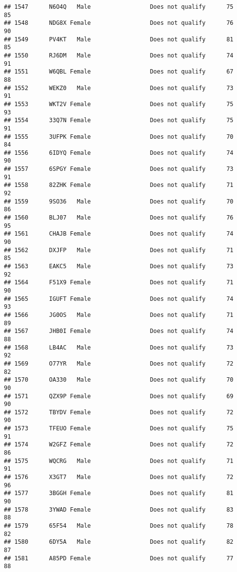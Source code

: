 \documentclass[
]{article}
\begin{document}
\begin{verbatim}
## 1547      N6O4Q   Male                 Does not qualify      75       85
## 1548      NDG8X Female                 Does not qualify      76       90
## 1549      PV4KT   Male                 Does not qualify      81       85
## 1550      RJ6DM   Male                 Does not qualify      74       91
## 1551      W6QBL Female                 Does not qualify      67       88
## 1552      WEKZ0   Male                 Does not qualify      73       91
## 1553      WKT2V Female                 Does not qualify      75       93
## 1554      33Q7N Female                 Does not qualify      75       91
## 1555      3UFPK Female                 Does not qualify      70       84
## 1556      6IDYQ Female                 Does not qualify      74       90
## 1557      6SPGY Female                 Does not qualify      73       91
## 1558      82ZHK Female                 Does not qualify      71       92
## 1559      9SO36   Male                 Does not qualify      70       86
## 1560      BLJ07   Male                 Does not qualify      76       95
## 1561      CHAJB Female                 Does not qualify      74       90
## 1562      DXJFP   Male                 Does not qualify      71       85
## 1563      EAKC5   Male                 Does not qualify      73       92
## 1564      F51X9 Female                 Does not qualify      71       90
## 1565      IGUFT Female                 Does not qualify      74       93
## 1566      JG0OS   Male                 Does not qualify      71       89
## 1567      JHB0I Female                 Does not qualify      74       88
## 1568      LB4AC   Male                 Does not qualify      73       92
## 1569      O77YR   Male                 Does not qualify      72       82
## 1570      OA330   Male                 Does not qualify      70       90
## 1571      QZX9P Female                 Does not qualify      69       90
## 1572      TBYDV Female                 Does not qualify      72       90
## 1573      TFEUO Female                 Does not qualify      75       91
## 1574      W2GFZ Female                 Does not qualify      72       86
## 1575      WQCRG   Male                 Does not qualify      71       91
## 1576      X3GT7   Male                 Does not qualify      72       96
## 1577      3BGGH Female                 Does not qualify      81       90
## 1578      3YWAD Female                 Does not qualify      83       88
## 1579      65F54   Male                 Does not qualify      78       82
## 1580      6DY5A   Male                 Does not qualify      82       87
## 1581      A85PD Female                 Does not qualify      77       88

\end{verbatim}
\end{document}
